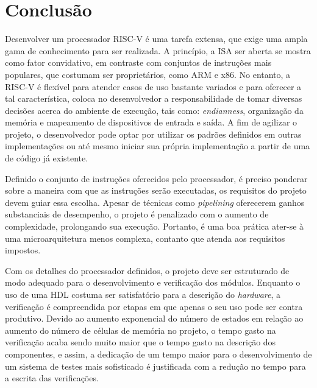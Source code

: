 
\chapter{Conclusão}
\label{cap:4}

Desenvolver um processador RISC-V é uma tarefa extensa, que exige uma ampla gama
de conhecimento para ser realizada. A princípio, a ISA ser aberta se mostra como
fator convidativo, em contraste com conjuntos de instruções mais populares, que
costumam ser proprietários, como ARM e x86. No entanto, a RISC-V é flexível para
atender casos de uso bastante variados e para oferecer a tal característica, coloca no
desenvolvedor a responsabilidade de tomar diversas decisões acerca do ambiente de
execução, tais como: \emph{endianness}, organização da memória e mapeamento de dispositivos
de entrada e saída. A fim de agilizar o projeto, o desenvolvedor pode optar por utilizar
os padrões definidos em outras implementações ou até mesmo iniciar sua própria
implementação a partir de uma de código já existente.

Definido o conjunto de instruções oferecidos pelo processador, é preciso ponderar
sobre a maneira com que as instruções serão executadas, os requisitos do projeto devem
guiar essa escolha. Apesar de técnicas como \emph{pipelining} oferecerem
ganhos substanciais de desempenho, o projeto é penalizado com o aumento de complexidade, 
prolongando sua execução. Portanto, é uma boa prática ater-se à uma microarquitetura menos 
complexa, contanto que atenda aos requisitos impostos.

Com os detalhes do processador definidos, o projeto deve ser estruturado de modo adequado 
para o desenvolvimento e verificação dos módulos. Enquanto o uso de uma HDL costuma ser 
satisfatório para a descrição do \emph{hardware}, a verificação é compreendida por etapas em que
apenas o seu uso pode ser contra produtivo. Devido ao aumento exponencial do número de estados
em relação ao aumento do número de células de memória no projeto, o tempo gasto na verificação
acaba sendo muito maior que o tempo gasto na descrição dos componentes, e assim, a dedicação
de um tempo maior para o desenvolvimento de um sistema de testes mais sofisticado é
justificada com a redução no tempo para a escrita das verificações.

